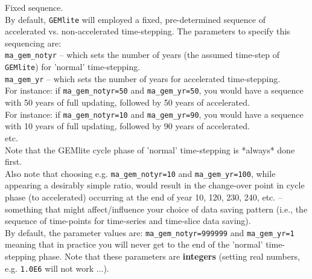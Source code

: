 \documentclass[10pt,twoside]{article}
\begin{document}
\begin{compactenum}
	
	\item Fixed sequence.
	\\By default, \texttt{GEMlite} will employed a fixed, pre-determined sequence of accelerated vs. non-accelerated time-stepping. The parameters to specify this sequencing are:
	\\\texttt{ma\_gem\_notyr} -- which sets the number of years (the assumed time-step of \texttt{GEMlite}) for 'normal' time-stepping.
	\\\texttt{ma\_gem\_yr} -- which sets the number of years for accelerated time-stepping.
\\For instance: if \texttt{ma\_gem\_notyr=50} and \texttt{ma\_gem\_yr=50}, you would have a sequence with 50 years of full updating, followed by 50 years of accelerated.
\\For instance: if \texttt{ma\_gem\_notyr=10} and \texttt{ma\_gem\_yr=90}, you would have a sequence with 10 years of full updating, followed by 90 years of accelerated.
\\etc.
\\Note that the GEMlite cycle phase of 'normal' time-stepping is *always* done first.
\\Also note that choosing e.g. \texttt{ma\_gem\_notyr=10} and \texttt{ma\_gem\_yr=100}, while appearing a desirably simple ratio, would result in the change-over point in cycle phase (to accelerated) occurring at the end of year 10, 120, 230, 240, etc. -- something that might affect/influence your choice of data saving pattern (i.e., the sequence of time-points for time-series and time-slice data saving).
\\By default, the parameter values are: \texttt{ma\_gem\_notyr=999999} and \texttt{ma\_gem\_yr=1} meaning that in practice you will never get to the end of the 'normal' time-stepping phase. Note that these parameters are \textbf{integers} (setting real numbers, e.g. \texttt{1.0E6} will not work ...).


\end{compactenum}
\end{document}
